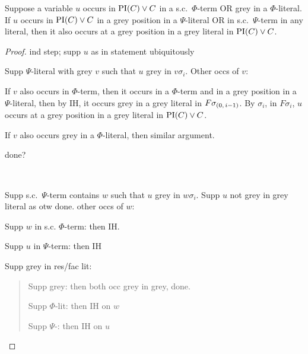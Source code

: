 \documentclass[,%
	draft=false,%
	numbers=noendperiod
	12pt,
	a4paper,
	oneside,%
	openany,
]{memoir}
\begin{document}
\begin{clemma}
	\label{last_lemma}
	Suppose a variable $u$ occurs  in $\operatorname{PI}(C) \lor C$ in a s.c.\ $\Phi$-term OR grey in a $\Phi$-literal.
	If $u$ occurs in $\operatorname{PI}(C) \lor C$ in a grey position in a $\Psi$-literal OR in s.c.\ $\Psi$-term in any literal, then it also occurs at a grey position in a grey literal in $\operatorname{PI}(C) \lor C$.
\end{clemma}
\begin{proof}
	ind step; supp $u$ as in statement ubiquitously

	Supp $\Psi$-literal with grey $v$ such that $u$ grey in $v\sigma_i$.
	Other occs of $v$:

	If $v$ also occurs in $\Phi$-term, then it occurs in a $\Phi$-term and in a grey position in a $\Psi$-literal, then by IH, it occurs grey in a grey literal in $F\sigma_{(0,\,i-1)}$.
	By $\sigma_i$, in $F\sigma_i$, $u$ occurs at a grey position in a grey literal in $\operatorname{PI}(C) \lor C$.

	If $v$ also occurs grey in a $\Phi$-literal, then similar argument.

	done?

	~

	Supp s.c.\ $\Psi$-term contains $w$ such that $u$ grey in $w\sigma_i$.
	Supp $u$ not grey in grey literal as otw done.
	other occs of $w$:

	Supp $w$ in s.c. $\Phi$-term: then IH.

	Supp $u$ in $\Psi$-term: then IH

	Supp grey in res/fac lit:
	\begin{quote}
		Supp grey: then both occ grey in grey, done.

		Supp $\Phi$-lit: then IH on $w$

		Supp $\Psi$-: then IH on $u$
	\end{quote}

\end{proof}

\clearpage
\end{document}
